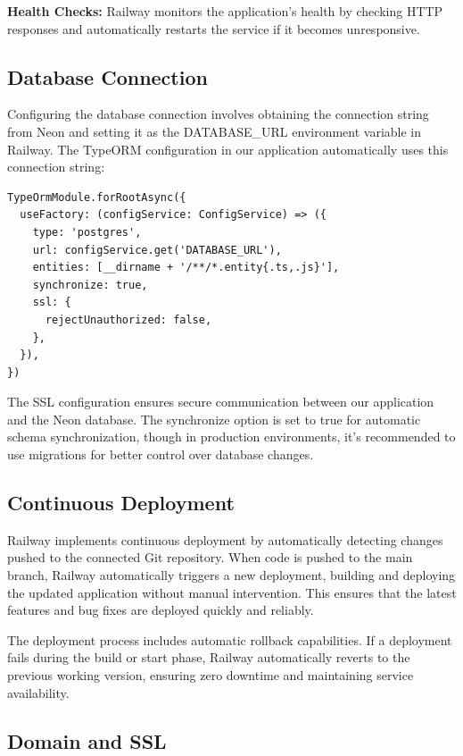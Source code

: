 \textbf{Health Checks:} Railway monitors the application's health by checking HTTP responses and automatically restarts the service if it becomes unresponsive.

\subsection{Database Connection}

Configuring the database connection involves obtaining the connection string from Neon and setting it as the DATABASE\_URL environment variable in Railway. The TypeORM configuration in our application automatically uses this connection string:

\begin{verbatim}
TypeOrmModule.forRootAsync({
  useFactory: (configService: ConfigService) => ({
    type: 'postgres',
    url: configService.get('DATABASE_URL'),
    entities: [__dirname + '/**/*.entity{.ts,.js}'],
    synchronize: true,
    ssl: {
      rejectUnauthorized: false,
    },
  }),
})
\end{verbatim}

The SSL configuration ensures secure communication between our application and the Neon database. The synchronize option is set to true for automatic schema synchronization, though in production environments, it's recommended to use migrations for better control over database changes.

\subsection{Continuous Deployment}

Railway implements continuous deployment by automatically detecting changes pushed to the connected Git repository. When code is pushed to the main branch, Railway automatically triggers a new deployment, building and deploying the updated application without manual intervention. This ensures that the latest features and bug fixes are deployed quickly and reliably.

The deployment process includes automatic rollback capabilities. If a deployment fails during the build or start phase, Railway automatically reverts to the previous working version, ensuring zero downtime and maintaining service availability.

\subsection{Domain and SSL}

